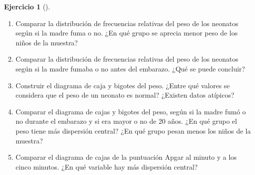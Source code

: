 \documentclass[
  spanish,
  a4paper,
]{scrreport}
\theoremstyle{definition}
\newtheorem{exercise}{Ejercicio}[chapter]
\theoremstyle{remark}
\begin{document}
\begin{exercise}[]
\begin{enumerate}
\item
  Comparar la distribución de frecuencias relativas del peso de los
  neonatos según si la madre fuma o no. ¿En qué grupo se aprecia menor
  peso de los niños de la muestra?
\item
  Comparar la distribución de frecuencias relativas del peso de los
  neonatos según si la madre fumaba o no antes del embarazo. ¿Qué se
  puede concluir?
\item
  Construir el diagrama de caja y bigotes del peso. ¿Entre qué valores
  se considera que el peso de un neonato es normal? ¿Existen datos
  atípicos?
\item
  Comparar el diagrama de cajas y bigotes del peso, según si la madre
  fumó o no durante el embarazo y si era mayor o no de 20 años. ¿En qué
  grupo el peso tiene más dispersión central? ¿En qué grupo pesan menos
  los niños de la muestra?
\item
  Comparar el diagrama de cajas de la puntuación Apgar al minuto y a los
  cinco minutos. ¿En qué variable hay más dispersión central?
\end{enumerate}

\end{exercise}
\end{document}
